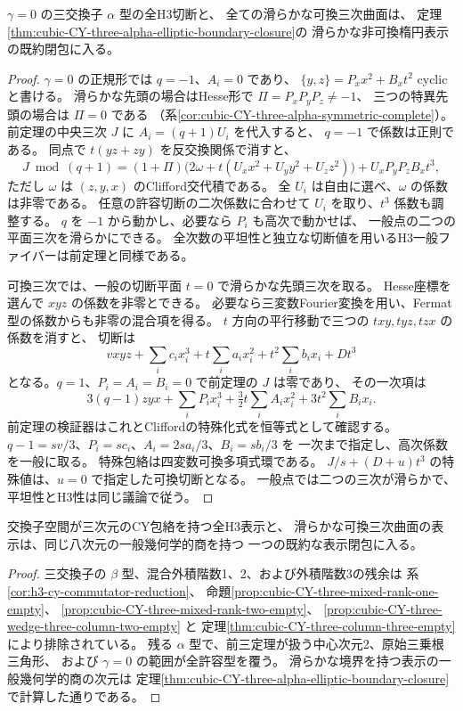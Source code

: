 \begin{theorem}[対称Clifford切断と可換三次の特殊化]
\label{thm:cubic-CY-three-alpha-clifford-commutative-closure}
$\gamma=0$ の三交換子 $\alpha$ 型の全H3切断と、
全ての滑らかな可換三次曲面は、
定理\ref{thm:cubic-CY-three-alpha-elliptic-boundary-closure}の
滑らかな非可換楕円表示の既約閉包に入る。
\end{theorem}
\begin{proof}
$\gamma=0$ の正規形では $q=-1$、$A_i=0$ であり、
$\{y,z\}=P_x x^2+B_x t^2$ cyclicと書ける。
滑らかな先頭の場合はHesse形で $\Pi=P_xP_yP_z\ne-1$、
三つの特異先頭の場合は $\Pi=0$ である
（系\ref{cor:cubic-CY-three-alpha-symmetric-complete}）。
前定理の中央三次 $J$ に $A_i=(q+1)U_i$ を代入すると、
$q=-1$ で係数は正則である。
同点で $t(yz+zy)$ を反交換関係で消すと、
\[
 J\bmod(q+1)=(1+\Pi)
 \bigl(2\omega+t(U_x x^2+U_y y^2+U_z z^2)\bigr)
 +U_xP_yP_zB_x t^3 ,
\]
ただし $\omega$ は $(z,y,x)$ のClifford交代積である。
全 $U_i$ は自由に選べ、$\omega$ の係数は非零である。
任意の許容切断の二次係数に合わせて $U_i$ を取り、$t^3$ 係数も調整する。
$q$ を $-1$ から動かし、必要なら $P_i$ も高次で動かせば、
一般点の二つの平面三次を滑らかにできる。
全次数の平坦性と独立な切断値を用いるH3一般ファイバーは前定理と同様である。

可換三次では、一般の切断平面 $t=0$ で滑らかな先頭三次を取る。
Hesse座標を選んで $xyz$ の係数を非零とできる。
必要なら三変数Fourier変換を用い、Fermat型の係数からも非零の混合項を得る。
$t$ 方向の平行移動で三つの $txy,tyz,tzx$ の係数を消すと、
切断は
\[
 vxyz+\sum_i c_i x_i^3+t\sum_i a_i x_i^2+t^2\sum_i b_i x_i+Dt^3
\]
となる。$q=1$、$P_i=A_i=B_i=0$ で前定理の $J$ は零であり、
その一次項は
\[
 3(q-1)zyx+\sum_i P_i x_i^3
 +\tfrac32t\sum_i A_i x_i^2+3t^2\sum_i B_i x_i .
\]
前定理の検証器はこれとCliffordの特殊化式を恒等式として確認する。
$q-1=sv/3$、$P_i=sc_i$、$A_i=2sa_i/3$、$B_i=sb_i/3$ を
一次まで指定し、高次係数を一般に取る。
特殊包絡は四変数可換多項式環である。
$J/s+(D+u)t^3$ の特殊値は、$u=0$ で指定した可換切断となる。
一般点では二つの三次が滑らかで、平坦性とH3性は同じ議論で従う。
\end{proof}

\begin{corollary}\label{cor:cubic-CY-three-presentation-closure}
交換子空間が三次元のCY包絡を持つ全H3表示と、
滑らかな可換三次曲面の表示は、同じ八次元の一般幾何学的商を持つ
一つの既約な表示閉包に入る。
\end{corollary}
\begin{proof}
三交換子の $\beta$ 型、混合外積階数1、2、および外積階数3の残余は
系\ref{cor:h3-cy-commutator-reduction}、
命題\ref{prop:cubic-CY-three-mixed-rank-one-empty}、
\ref{prop:cubic-CY-three-mixed-rank-two-empty}、
\ref{prop:cubic-CY-three-wedge-three-column-two-empty} と
定理\ref{thm:cubic-CY-three-column-three-empty}により排除されている。
残る $\alpha$ 型で、前三定理が扱う中心次元2、原始三乗根三角形、
および $\gamma=0$ の範囲が全許容型を覆う。
滑らかな境界を持つ表示の一般幾何学的商の次元は
定理\ref{thm:cubic-CY-three-alpha-elliptic-boundary-closure}で計算した通りである。
\end{proof}

